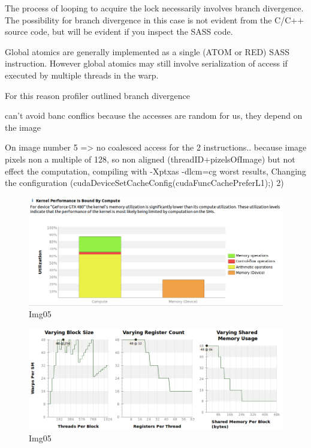 \documentclass[a4paper]{article}
\begin{document}
The process of looping to acquire the lock necessarily involves branch divergence. The possibility for branch divergence in this case is not evident from the C/C++ source code, but will be evident if you inspect the SASS code.

Global atomics are generally implemented as a single (ATOM or RED) SASS instruction. However global atomics may still involve serialization of access if executed by multiple threads in the warp. 

For this reason profiler outlined branch divergence

can't avoid banc conflics because the accesses are random for us, they depend on the image


On image number 5 => no coalesced access for the 2 instructions.. because image pixels non a multiple of 128, so non aligned (threadID+pizelsOfImage) but not effect the computation, compiling with -Xptxas -dlcm=cg worst results, Changing the configuration (cudaDeviceSetCacheConfig(cudaFuncCachePreferL1);)
2) 





\begin{figure}[ht]
    \centering
    \includegraphics[width=0.7\linewidth]{profiling/darker/darker_utilization_00}
    \caption{Img05}
    \label{fig:du}
\end{figure}
\FloatBarrier

\begin{figure}[ht]
    \centering
    \includegraphics[width=0.7\linewidth]{profiling/darker/darker_varying}
    \caption{Img05}
    \label{fig:dv}
\end{figure}
\FloatBarrier
\end{document}
